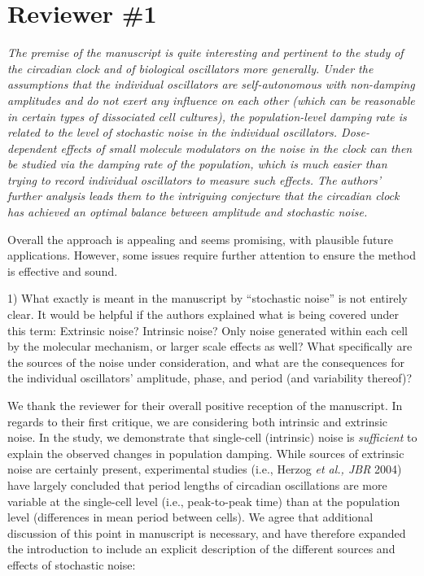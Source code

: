 \documentclass[11pt, letterpaper]{article}
\newenvironment{reviewer}{\itshape\color{gray}}{}
\begin{document}
\section*{Reviewer \#1}
\begin{reviewer}
The premise of the manuscript is quite interesting and pertinent to the study of the circadian clock and of biological oscillators more generally. 
Under the assumptions that the individual oscillators are self-autonomous with non-damping amplitudes and do not exert any influence on each other (which can be reasonable in certain types of dissociated cell cultures), the population-level damping rate is related to the level of stochastic noise in the individual oscillators. 
Dose-dependent effects of small molecule modulators on the noise in the clock can then be studied via the damping rate of the population, which is much easier than trying to record individual oscillators to measure such effects. 
The authors' further analysis leads them to the intriguing conjecture that the circadian clock has achieved an optimal balance between amplitude and stochastic noise.

Overall the approach is appealing and seems promising, with plausible future applications. However, some issues require further attention to ensure the method is effective and sound.

1) What exactly is meant in the manuscript by ``stochastic noise'' is not entirely clear. It would be helpful if the authors explained what is being covered under this term: Extrinsic noise? Intrinsic noise? Only noise generated within each cell by the molecular mechanism, or larger scale effects as well? What specifically are the sources of the noise under consideration, and what are the consequences for the individual oscillators' amplitude, phase, and period (and variability thereof)?
\end{reviewer}

We thank the reviewer for their overall positive reception of the manuscript. 
In regards to their first critique, we are considering both intrinsic and extrinsic noise. 
In the study, we demonstrate that single-cell (intrinsic) noise is {\itshape sufficient} to explain the observed changes in population damping.
While sources of extrinsic noise are certainly present, experimental studies (i.e., Herzog {\itshape et al., JBR} 2004) have largely concluded that period lengths of circadian oscillations are more variable at the single-cell level (i.e., peak-to-peak time) than at the population level (differences in mean period between cells).
We agree that additional discussion of this point in manuscript is necessary, and have therefore expanded the introduction to include an explicit description of the different sources and effects of stochastic noise:
\end{document}
